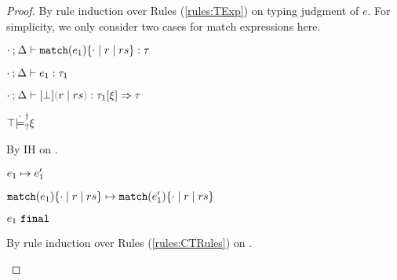 \begin{proof}
By rule induction over Rules (\ref{rules:TExp}) on typing judgment of $e$. For simplicity, we only consider two cases for match expressions here.
\begin{byCases}
\item[\text{(\ref{rule:TMatchZPre})}]
  \begin{pfsteps*}
  \item $\cdot \mathbin{;} \Delta \vdash \mathtt{match}(e_1) \{\cdot \mid r \mid rs\} : \tau$  
  \item $\cdot \mathbin{;} \Delta \vdash e_1 : \tau_1$  
  \item $\chrulstyp{\cdot}{\Delta}{\cfalsity}{\hrulesP{r}{rs}}{\tau_1}{\xi}{\tau}$  
  \item $\top \dot{\models}_{?}^{\dag} \xi$  
  \end{pfsteps*}
  By IH on .
  \begin{byCases}

  \item[\text{Scrutinee takes a step}]
    \begin{pfsteps*}
    \item $e_1 \mapsto e_1'$  
    \item $\mathtt{match}(e_1) \{\cdot \mid r \mid rs\} \mapsto \mathtt{match}(e_1') \{\cdot \mid r \mid rs\}$ 
    \end{pfsteps*}

  \item[\text{Scrutinee is final}]
    \begin{pfsteps*}
    \item $e_1 ~\mathtt{final}$  
    \end{pfsteps*}
    By rule induction over Rules (\ref{rules:CTRules}) on .
    \begin{byCases}


\end{byCases}
\end{byCases}
\end{byCases}
\end{proof}

